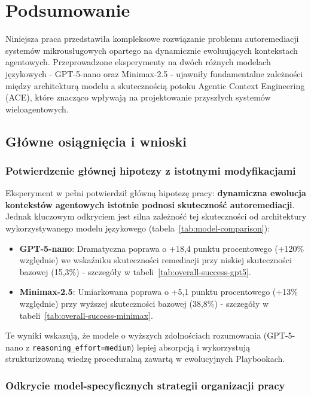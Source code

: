 \chapter{Podsumowanie}

Niniejsza praca przedstawiła kompleksowe rozwiązanie problemu autoremediacji systemów mikrousługowych opartego na dynamicznie ewoluujących kontekstach agentowych. Przeprowadzone eksperymenty na dwóch różnych modelach językowych - GPT-5-nano oraz Minimax-2.5 - ujawniły fundamentalne zależności między architekturą modelu a skutecznością potoku Agentic Context Engineering (ACE), które znacząco wpływają na projektowanie przyszłych systemów wieloagentowych.

\section{Główne osiągnięcia i wnioski}

\subsection{Potwierdzenie głównej hipotezy z istotnymi modyfikacjami}

Eksperyment w pełni potwierdził główną hipotezę pracy: \textbf{dynamiczna ewolucja kontekstów agentowych istotnie podnosi skuteczność autoremediacji}. Jednak kluczowym odkryciem jest silna zależność tej skuteczności od architektury wykorzystywanego modelu językowego (tabela~\ref{tab:model-comparison}):

\begin{itemize}
    \item \textbf{GPT-5-nano}: Dramatyczna poprawa o +18,4 punktu procentowego (+120\% względnie) we wskaźniku skuteczności remediacji przy niskiej skuteczności bazowej (15,3\%) - szczegóły w tabeli~\ref{tab:overall-success-gpt5}.
    \item \textbf{Minimax-2.5}: Umiarkowana poprawa o +5,1 punktu procentowego (+13\% względnie) przy wyższej skuteczności bazowej (38,8\%) - szczegóły w tabeli~\ref{tab:overall-success-minimax}.
\end{itemize}

Te wyniki wskazują, że modele o wyższych zdolnościach rozumowania (GPT-5-nano z \texttt{reasoning\_effort=medium}) lepiej absorpcją i wykorzystują strukturizowaną wiedzę proceduralną zawartą w ewolucyjnych Playbookach.

\subsection{Odkrycie model-specyficznych strategii organizacji pracy}

